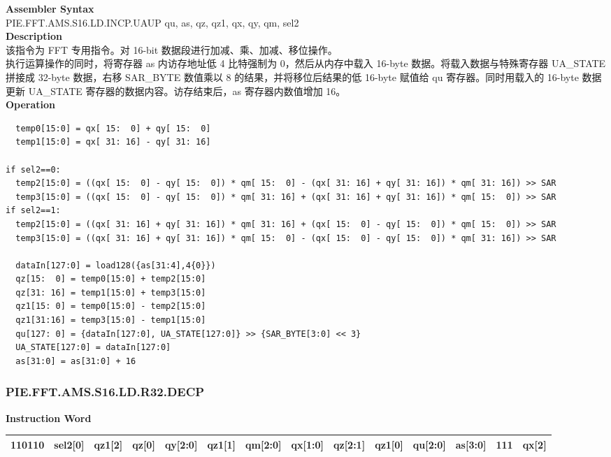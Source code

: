 \textbf{Assembler Syntax} \\
PIE.FFT.AMS.S16.LD.INCP.UAUP qu, as, qz, qz1, qx, qy, qm, sel2 \\
\textbf{Description} \\
该指令为 FFT 专用指令。对 16-bit 数据段进行加减、乘、加减、移位操作。\\
执行运算操作的同时，将寄存器 as 内访存地址低 4 比特强制为 0，然后从内存中载入 16-byte 数据。将载入数据与特殊寄存器 UA\_STATE 拼接成 32-byte 数据，右移 SAR\_BYTE 数值乘以 8 的结果，并将移位后结果的低 16-byte 赋值给 qu 寄存器。同时用载入的 16-byte 数据更新 UA\_STATE 寄存器的数据内容。访存结束后，as 寄存器内数值增加 16。\\
\textbf{Operation}
\begin{lstlisting}
  temp0[15:0] = qx[ 15:  0] + qy[ 15:  0]
  temp1[15:0] = qx[ 31: 16] - qy[ 31: 16]

if sel2==0:
  temp2[15:0] = ((qx[ 15:  0] - qy[ 15:  0]) * qm[ 15:  0] - (qx[ 31: 16] + qy[ 31: 16]) * qm[ 31: 16]) >> SAR
  temp3[15:0] = ((qx[ 15:  0] - qy[ 15:  0]) * qm[ 31: 16] + (qx[ 31: 16] + qy[ 31: 16]) * qm[ 15:  0]) >> SAR
if sel2==1:
  temp2[15:0] = ((qx[ 31: 16] + qy[ 31: 16]) * qm[ 31: 16] + (qx[ 15:  0] - qy[ 15:  0]) * qm[ 15:  0]) >> SAR
  temp3[15:0] = ((qx[ 31: 16] + qy[ 31: 16]) * qm[ 15:  0] - (qx[ 15:  0] - qy[ 15:  0]) * qm[ 31: 16]) >> SAR

  dataIn[127:0] = load128({as[31:4],4{0}})
  qz[15:  0] = temp0[15:0] + temp2[15:0]
  qz[31: 16] = temp1[15:0] + temp3[15:0]
  qz1[15: 0] = temp0[15:0] - temp2[15:0]
  qz1[31:16] = temp3[15:0] - temp1[15:0]
  qu[127: 0] = {dataIn[127:0], UA_STATE[127:0]} >> {SAR_BYTE[3:0] << 3}
  UA_STATE[127:0] = dataIn[127:0]
  as[31:0] = as[31:0] + 16
\end{lstlisting}

\newpage
\subsubsection{PIE.FFT.AMS.S16.LD.R32.DECP}\label{instruction:PIEFFTAMSS16LDR32DECP}
\setlength\tabcolsep{5pt}
\textbf{Instruction Word} \\
\begin{tabular}{|c|c|c|c|c|c|c|c|c|c|c|c|c|c|}
	\hline
	110110 & sel2[0] & qz1[2] & qz[0] & qy[2:0] & qz1[1] & qm[2:0] & qx[1:0] & qz[2:1] & qz1[0] & qu[2:0] & as[3:0] & 111 & qx[2] \\
	\hline
\end{tabular}

